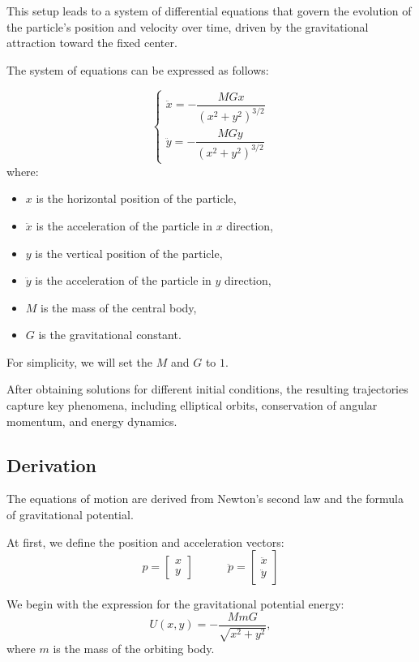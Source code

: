 \documentclass[11pt]{article}
\begin{document}
This setup leads to a system of differential equations that govern the evolution of the particle’s position and velocity over time, driven by the gravitational attraction toward the fixed center. 

The system of equations can be expressed as follows:

\[
\begin{cases}
\ddot{x} = -\dfrac{MGx}{(x^2 + y^2)^{3/2}} \\[10pt]
\ddot{y} = -\dfrac{MGy}{(x^2 + y^2)^{3/2}}
\end{cases}
\]
where:
\begin{itemize}
    \item $x$ is the horizontal position of the particle,
    \item $\ddot x$ is the acceleration of the particle in $x$ direction,
    \item $y$ is the vertical position of the particle,
    \item $\ddot y$ is the acceleration of the particle in $y$ direction,
    \item $M$ is the mass of the central body,
    \item $G$ is the gravitational constant.
\end{itemize}
For simplicity, we will set the $M$ and $G$ to $1$.

After obtaining solutions for different initial conditions, the resulting trajectories capture key phenomena, including elliptical orbits, conservation of angular momentum, and energy dynamics.


\subsection{Derivation}
The equations of motion are derived from Newton’s second law and the formula of gravitational potential.

At first, we define the position and acceleration vectors:
\[
p = 
\begin{bmatrix}
    x \\
    y
\end{bmatrix}
\quad \quad \quad
\ddot p =
\begin{bmatrix}
    \ddot x \\
    \ddot y
\end{bmatrix}
\]

We begin with the expression for the gravitational potential energy:
\[
U(x,y) = - \frac{MmG}{\sqrt{x^2+y^2}},
\]
where $m$ is the mass of the orbiting body.
\end{document}
